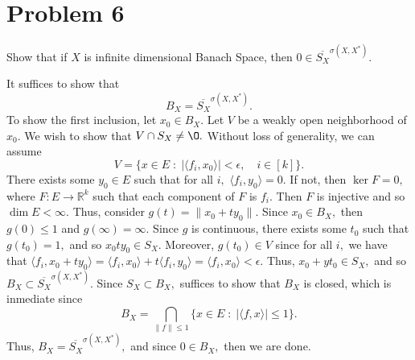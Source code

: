 \documentclass[11pt]{article}
\newcommand{\bbR}{\mathbb{R}}
\renewcommand{\emptyset}{\O}
\begin{document}
\section*{Problem 6}
\begin{problem}
    Show that if $X$ is infinite dimensional Banach Space, then $0 \in \overline{S_X}^{\sigma(X, X^*)}.$
\end{problem}
\begin{solution}
    It suffices to show that 
    \[B_X = \overline{S_X}^{\sigma(X, X^*)}.\] To show the first inclusion, let $x_0 \in B_X.$ Let $V$ be a weakly open neighborhood of $x_0.$ We wish to show that $V\cap S_X \neq \emptyset.$ Without loss of generality, we can assume
    \[V = \{x \in E \; : \; |\langle f_i, x_0\rangle|< \epsilon, \quad i \in [k]\}.\] There exists some $y_0 \in E$ such that for all $i,$ $\langle f_i, y_0 \rangle = 0.$ If not, then $\ker F = 0,$ where $F: E\to \bbR^k$ such that each component of $F$ is $f_i.$ Then $F$ is injective and so $\dim E < \infty.$ Thus, consider $g(t) = \|x_0 + ty_0\|.$ Since $x_0 \in B_X,$ then $g(0) \leq 1$ and $g(\infty) = \infty.$ Since $g$ is continuous, there exists some $t_0$ such that $g(t_0) = 1,$ and so $x_0 
 ty_0\in S_X.$ Moreover, $g(t_0) \in V$ since for all $i,$ we have that $\langle f_i, x_0  + ty_0 \rangle = \langle f_i, x_0\rangle  + t\langle f_i, y_0 \rangle = \langle f_i, x_0\rangle < \epsilon.$ Thus, $x_0 + yt_0 \in S_X,$ and so $B_X \subset \overline{S_X}^{\sigma(X, X^*)}.$ Since $S_X \subset B_X,$ suffices to show that $B_X$ is closed, which is inmediate since 
 \[B_X  = \bigcap_{\|f\| \leq 1} \{x\in E \; : \; |\langle f, x\rangle| \leq 1\}.\] Thus, $B_X = \overline{S_X}^{\sigma(X, X^*)},$ and since $0\in B_X,$ then we are done. 
\end{solution}
\newpage
\end{document}
